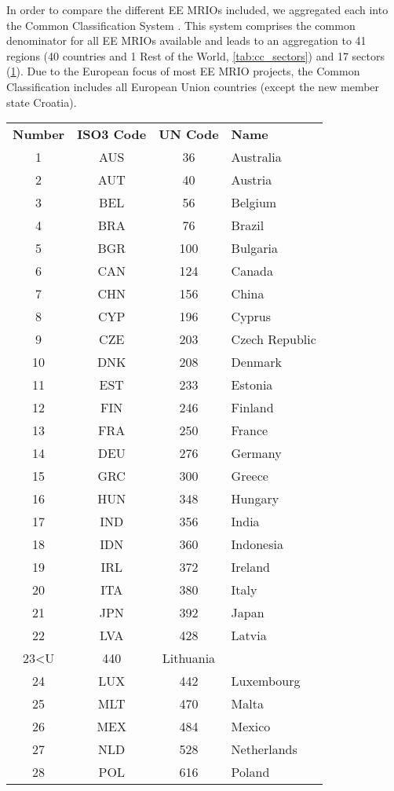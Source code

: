 In order to compare the different EE MRIOs included, we aggregated each into the Common Classification System \cite{Steen_Olsen_2014}. 
This system comprises the common denominator for all EE MRIOs available and leads to an aggregation to 41 regions (40 countries and 1 Rest of the World, \ref{tab:cc_sectors}) and 17 sectors (\ref{tab:cc_regions}). 
Due to the European focus of most EE MRIO projects, the Common Classification includes all European Union countries (except the new member state Croatia).


\begin{table}
\label{tab:cc_regions}

\begin{tabular}{ c c c l }
\textbf{Number} & \textbf{ISO3 Code} & \textbf{UN Code} & \textbf{Name}\\
1&AUS & 36 & Australia\\
2&AUT & 40 & Austria\\
3&BEL & 56 & Belgium\\
4&BRA & 76 & Brazil\\
5&BGR & 100 & Bulgaria\\
6&CAN & 124 & Canada\\
7&CHN & 156 & China\\
8&CYP & 196 & Cyprus\\
9&CZE & 203 & Czech Republic\\
10&DNK & 208 & Denmark\\
11&EST & 233 & Estonia\\
12&FIN & 246 & Finland\\
13&FRA & 250 & France\\
14&DEU & 276 & Germany\\
15&GRC & 300 & Greece\\
16&HUN & 348 & Hungary\\
17&IND & 356 & India\\
18&IDN & 360 & Indonesia\\
19&IRL & 372 & Ireland\\
20&ITA & 380 & Italy\\
21&JPN & 392 & Japan\\
22&LVA & 428 & Latvia\\
23<U & 440 & Lithuania\\
24&LUX & 442 & Luxembourg\\
25&MLT & 470 & Malta\\
26&MEX & 484 & Mexico\\
27&NLD & 528 & Netherlands\\
28&POL & 616 & Poland\\

\end{tabular}
\end{table}

